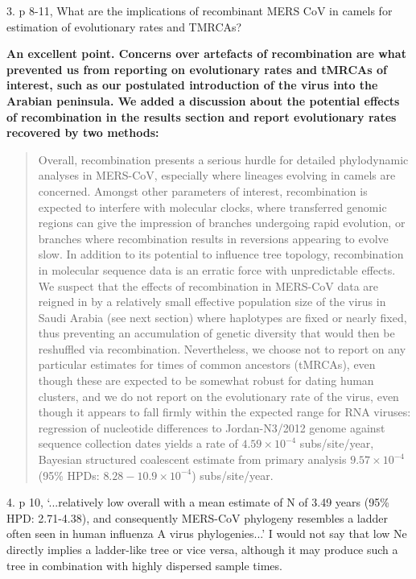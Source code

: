 \documentclass[11pt,oneside,letterpaper]{article}
\begin{document}
3. p 8-11, What are the implications of recombinant MERS CoV in camels for estimation of evolutionary rates and TMRCAs?

\textbf{An excellent point. Concerns over artefacts of recombination are what prevented us from reporting on evolutionary rates and tMRCAs of interest, such as our postulated introduction of the virus into the Arabian peninsula. We added a discussion about the potential effects of recombination in the results section and report evolutionary rates recovered by two methods:}

\begin{quotation}
Overall, recombination presents a serious hurdle for detailed phylodynamic analyses in MERS-CoV, especially where lineages evolving in camels are concerned.
Amongst other parameters of interest, recombination is expected to interfere with molecular clocks, where transferred genomic regions can give the impression of branches undergoing rapid evolution, or branches where recombination results in reversions appearing to evolve slow.
In addition to its potential to influence tree topology, recombination in molecular sequence data is an erratic force with unpredictable effects.
We suspect that the effects of recombination in MERS-CoV data are reigned in by a relatively small effective population size of the virus in Saudi Arabia (see next section) where haplotypes are fixed or nearly fixed, thus preventing an accumulation of genetic diversity that would then be reshuffled via recombination.
Nevertheless, we choose not to report on any particular estimates for times of common ancestors (tMRCAs), even though these are expected to be somewhat robust for dating human clusters, and we do not report on the evolutionary rate of the virus, even though it appears to fall firmly within the expected range for RNA viruses: regression of nucleotide differences to Jordan-N3/2012 genome against sequence collection dates yields a rate of $4.59 \times 10^{-4}$ subs/site/year, Bayesian structured coalescent estimate from primary analysis $9.57 \times 10^{-4}$ (95\% HPDs: $8.28-10.9 \times 10^{-4}$) subs/site/year.
\end{quotation}

4. p 10, `...relatively low overall with a mean estimate of N of 3.49 years (95\% HPD: 2.71-4.38), and consequently MERS-CoV phylogeny resembles a ladder often seen in human influenza A virus phylogenies...' I would not say that low Ne directly implies a ladder-like tree or vice versa, although it may produce such a tree in combination with highly dispersed sample times.
\end{document}
